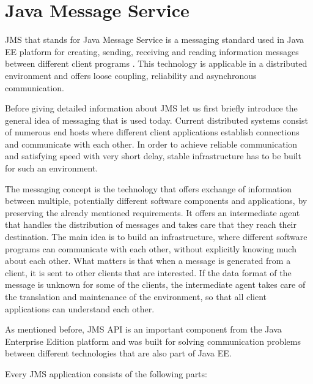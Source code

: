 \documentclass{sigplanconf}
\begin{document}
\section*{Java Message Service}

\smallskip
JMS that stands for Java Message Service is a messaging standard used in Java EE platform for creating, sending, receiving and reading information messages between different client programs \cite{jms} \cite{jmsd}. This technology is applicable in a distributed environment and offers loose coupling, reliability and asynchronous communication.

Before giving detailed information about JMS let us first briefly introduce the general idea of messaging that is used today. Current distributed systems consist of numerous end hosts where different client applications establish connections and communicate with each other. In order to achieve reliable communication and satisfying speed with very short delay, stable infrastructure has to be built for such an environment.

The messaging concept is the technology that offers exchange of information between multiple, potentially different software components and applications, by preserving the already mentioned requirements. It offers an intermediate agent that handles the distribution of messages and takes care that they reach their destination. The main idea is to build an infrastructure, where different software programs can communicate with each other, without explicitly knowing much about each other. What matters is that when a message is generated from a client, it is sent to other clients that are interested. If the data format of the message is unknown for some of the clients, the intermediate agent takes care of the translation and maintenance of the environment, so that all client applications can understand each other.

As mentioned before, JMS API is an important component from the Java Enterprise Edition platform and was built for solving communication problems between different technologies that are also part of Java EE.
	
Every JMS application consists of the following parts:
\end{document}
